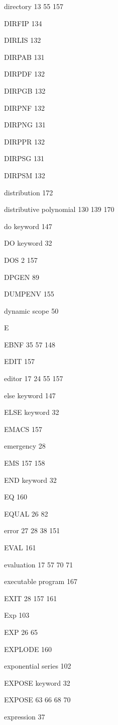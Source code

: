 \item directory  13 55 157
\item DIRFIP 134
\item DIRLIS 132
\item DIRPAB 131
\item DIRPDF 132
\item DIRPGB 132
\item DIRPNF 132
\item DIRPNG 131
\item DIRPPR 132
\item DIRPSG 131
\item DIRPSM 132
\item distribution 172
\item distributive polynomial  130 139 170
\item do keyword 147
\item DO keyword 32
\item DOS  2 157
\item DPGEN 89
\item DUMPENV 155
\item dynamic scope 50
\indexspace
\item {\Large E}
\item EBNF  35 57 148
\item EDIT 157
\item editor  17 24 55 157
\item else keyword 147
\item ELSE keyword 32
\item EMACS 157
\item emergency 28
\item EMS  157 158
\item END keyword 32
\item EQ 160
\item EQUAL  26 82
\item error  27 28 38 151
\item EVAL 161
\item evaluation  17 57 70 71
\item executable program 167
\item EXIT  28  157 161
\item Exp 103
\item EXP  26 65
\item EXPLODE 160
\item exponential series 102
\item EXPOSE keyword 32
\item EXPOSE  63 66 68 70
\item expression 37

